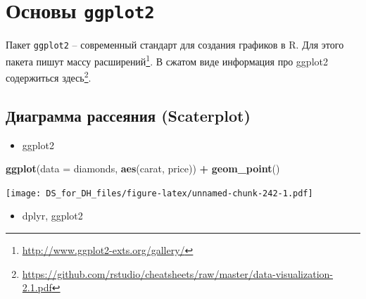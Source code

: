 \documentclass[
]{book}
\newenvironment{Shaded}{\begin{snugshade}}{\end{snugshade}}
\newcommand{\DataTypeTok}[1]{\textcolor[rgb]{0.13,0.29,0.53}{#1}}
\newcommand{\KeywordTok}[1]{\textcolor[rgb]{0.13,0.29,0.53}{\textbf{#1}}}
\newcommand{\NormalTok}[1]{#1}
\newcommand{\OperatorTok}[1]{\textcolor[rgb]{0.81,0.36,0.00}{\textbf{#1}}}
\newcommand{\StringTok}[1]{\textcolor[rgb]{0.31,0.60,0.02}{#1}}
\providecommand{\tightlist}{%
  \setlength{\itemsep}{0pt}\setlength{\parskip}{0pt}}
\renewcommand{\href}[2]{#2\footnote{\url{#1}}}
\begin{document}
\hypertarget{ux43eux441ux43dux43eux432ux44b-ggplot2}{%
\section{\texorpdfstring{Основы \texttt{ggplot2}}{Основы ggplot2}}\label{ux43eux441ux43dux43eux432ux44b-ggplot2}}

Пакет \texttt{ggplot2} -- современный стандарт для создания графиков в R. Для этого пакета пишут \href{http://www.ggplot2-exts.org/gallery/}{массу расширений}. В сжатом виде информация про ggplot2 \href{https://github.com/rstudio/cheatsheets/raw/master/data-visualization-2.1.pdf}{содержиться здесь}.

\hypertarget{ux434ux438ux430ux433ux440ux430ux43cux43cux430-ux440ux430ux441ux441ux435ux44fux43dux438ux44f-scaterplot}{%
\subsection{Диаграмма рассеяния (Scaterplot)}\label{ux434ux438ux430ux433ux440ux430ux43cux43cux430-ux440ux430ux441ux441ux435ux44fux43dux438ux44f-scaterplot}}

\begin{itemize}
\tightlist
\item
  ggplot2
\end{itemize}

\begin{Shaded}
\begin{Highlighting}[]
\KeywordTok{ggplot}\NormalTok{(}\DataTypeTok{data =}\NormalTok{ diamonds, }\KeywordTok{aes}\NormalTok{(carat, price)) }\OperatorTok{+}
\StringTok{  }\KeywordTok{geom_point}\NormalTok{()}
\end{Highlighting}
\end{Shaded}

\texttt{[image: DS\_for\_DH\_files/figure-latex/unnamed-chunk-242-1.pdf]}

\begin{itemize}
\tightlist
\item
  dplyr, ggplot2
\end{itemize}

\begin{Shaded}
\end{Shaded}
\end{document}
